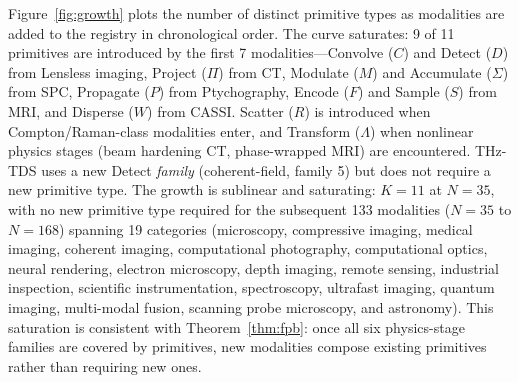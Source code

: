 \documentclass[11pt]{article}
\begin{document}
Figure~\ref{fig:growth} plots the number of distinct primitive types as modalities are added to the registry in chronological order. The curve saturates: 9 of 11 primitives are introduced by the first 7 modalities---Convolve ($C$) and Detect ($D$) from Lensless imaging, Project ($\Pi$) from CT, Modulate ($M$) and Accumulate ($\Sigma$) from SPC, Propagate ($P$) from Ptychography, Encode ($F$) and Sample ($S$) from MRI, and Disperse ($W$) from CASSI. Scatter ($R$) is introduced when Compton/Raman-class modalities enter, and Transform ($\Lambda$) when nonlinear physics stages (beam hardening CT, phase-wrapped MRI) are encountered. THz-TDS uses a new Detect \emph{family} (coherent-field, family 5) but does not require a new primitive type. The growth is sublinear and saturating: $K = 11$ at $N = 35$, with no new primitive type required for the subsequent 133 modalities ($N = 35$ to $N = 168$) spanning 19 categories (microscopy, compressive imaging, medical imaging, coherent imaging, computational photography, computational optics, neural rendering, electron microscopy, depth imaging, remote sensing, industrial inspection, scientific instrumentation, spectroscopy, ultrafast imaging, quantum imaging, multi-modal fusion, scanning probe microscopy, and astronomy). This saturation is consistent with Theorem~\ref{thm:fpb}: once all six physics-stage families are covered by primitives, new modalities compose existing primitives rather than requiring new ones.
\end{document}
